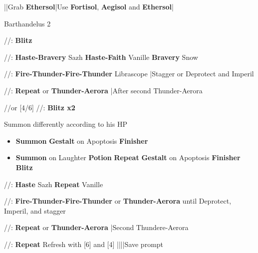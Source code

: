 \begin{mainlist}
	\item {}|\skip|Grab \textbf{Ethersol}|Use \textbf{Fortisol}, \textbf{Aegisol} and \textbf{Ethersol}|\skip
\end{mainlist}
\begin{fight}{Barthandelus 2}
	\item [4] \com/\com/\rav: \textbf{Blitz}
	\item [5] \syn/\rav/\sab: \textbf{Haste-Bravery} Sazh \to \textbf{Haste-Faith} Vanille \to \textbf{Bravery} Snow
	\item [3] \rav/\rav/\sab: \textbf{Fire-Thunder-Fire-Thunder} \to Librascope |Stagger or Deprotect and Imperil
	\item [2] \rav/\rav/\rav: \textbf{Repeat} or \textbf{Thunder-Aerora} |After second Thunder-Aerora
	\item [1] \com/\com/\med or [4/6] \com/\com/\rav: \textbf{Blitz x2}
	\item Summon differently according to his HP
	\begin{itemize}
		\item \textbf{Summon} \to \textbf{Gestalt} on Apoptosis \to \textbf{Finisher}
		\item \textbf{Summon} on Laughter \to \textbf{Potion} \to  \textbf{Repeat} \to \textbf{Gestalt} on Apoptosis \to \textbf{Finisher} \to \textbf{Blitz}
	\end{itemize}
	\item [5] \syn/\rav/\sab: \textbf{Haste} Sazh \to \textbf{Repeat} Vanille
	\item [3] \rav/\rav/\sab: \textbf{Fire-Thunder-Fire-Thunder} or \textbf{Thunder-Aerora} until Deprotect, Imperil, and stagger
	\item [2] \com/\rav/\rav: \textbf{Repeat} or \textbf{Thunder-Aerora} |Second Thundere-Aerora
	\item [1] \com/\com/\med: \textbf{Repeat} \to Refresh with [6] and [4] |\skip|\skip||Save prompt
\end{fight}
